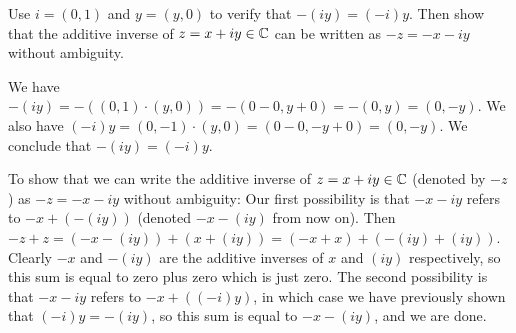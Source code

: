 \begin{problem}[Question 10]
    Use $i=(0,1)$ and $y=(y,0)$ to verify that $-(iy)=(-i)y.$ Then show that the additive inverse of $z=x+iy \in \mathbb{C}$ can be written as $-z=-x-iy$ without ambiguity.
\end{problem}
\begin{solution}
    We have $-(iy)=-\left( (0,1)\cdot(y,0) \right) = -\left( 0-0, y+0 \right) = -(0,y)=(0,-y)$. We also have $(-i)y=(0,-1)\cdot(y,0)=(0-0, -y+0)=(0,-y).$ We conclude that $-(iy)=(-i)y.$ 

    To show that we can write the additive inverse of $z = x+iy \in \mathbb{C}$ (denoted by $-z$ ) as $-z=-x-iy$ without ambiguity: Our first possibility is that $-x-iy$ refers to $-x+\left( -(iy) \right) $ (denoted $-x-(iy)$ from now on). Then $-z+z=(-x-(iy))+(x+(iy))=(-x+x)+(-(iy)+(iy))$. Clearly $-x$ and $-(iy)$ are the additive inverses of $x$ and $(iy)$ respectively, so this sum is equal to zero plus zero which is just zero. The second possibility is that $-x-iy$ refers to $-x+((-i)y)$, in which case we have previously shown that $(-i)y=-(iy)$, so this sum is equal to $-x-(iy)$, and we are done.
\end{solution}




